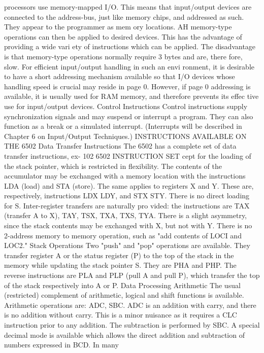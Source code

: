 \documentclass{book}
\begin{document}
processors use memory-mapped I/O. This means that input/output
devices are connected to the address-bus, just like memory chips,
and addressed as such. They appear to the programmer as mem
ory locations. AH memory-type operations can then be applied to
desired devices. This has the advantage of providing a wide vari
ety of instructions which can be applied. The disadvantage is that
memory-type operations normally require 3 bytes and are, there
fore, slow. For efficient input/output handling in such an envi
ronment, it is desirable to have a short addressing mechanism
available so that I/O devices whose handling speed is crucial may
reside in page 0. However, if page 0 addressing is available, it is
usually used for RAM memory, and therefore prevents its effec
tive use for input/output devices.
Control Instructions
Control instructions supply synchronization signals and may
suspend or interrupt a program. They can also function as a break
or a simulated interrupt. (Interrupts will be described in Chapter
6 on Input/Output Techniques.)
INSTRUCTIONS AVAILABLE ON THE 6502
Data Transfer Instructions
The 6502 has a complete set of data transfer instructions, ex-
102
6502 INSTRUCTION SET
cept for the loading of the stack pointer, which is restricted in
flexibility. The contents of the accumulator may be exchanged
with a memory location with the instructions LDA (load) and
STA (store). The same applies to registers X and Y. These are,
respectively, instructions LDX LDY, and STX STY. There is no
direct loading for S. Inter-register transfers are naturally pro
vided: the instructions are TAX (transfer A to X), TAY, TSX,
TXA, TXS, TYA. There is a slight asymmetry, since the stack
contents may be exchanged with X, but not with Y.
There is no 2-address memory to memory operation, such as "add
contents of LOCI and LOC2."
Stack Operations
Two "push" and "pop" operations are available. They transfer
register A or the status register (P) to the top of the stack in the
memory while updating the stack pointer S. They are PHA and
PHP. The reverse instructions are PLA and PLP (pull A and pull
P), which transfer the top of the stack respectively into A or P.
Data Processing
Arithmetic
The usual (restricted) complement of arithmetic, logical and
shift functions is available. Arithmetic operations are: ADC,
SBC. ADC is an addition with carry, and there is no addition
without carry. This is a minor nuisance as it requires a CLC
instruction prior to any addition. The subtraction is performed by
SBC.
A special decimal mode is available which allows the direct
addition and subtraction of numbers expressed in BCD. In many
\end{document}
